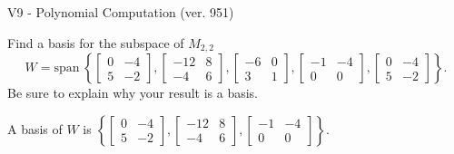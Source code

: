 \begin{exercise}
  \begin{exerciseTitle}V9 - Polynomial Computation (ver. 951)\end{exerciseTitle}
  \begin{exerciseStatement}
    Find a basis for the subspace of \(M_{2,2}\) 
\[W=\mathrm{span}\ \left\{\left[\begin{array}{cc}
0 & -4 \\
5 & -2
\end{array}\right] , \left[\begin{array}{cc}
-12 & 8 \\
-4 & 6
\end{array}\right] , \left[\begin{array}{cc}
-6 & 0 \\
3 & 1
\end{array}\right] , \left[\begin{array}{cc}
-1 & -4 \\
0 & 0
\end{array}\right] , \left[\begin{array}{cc}
0 & -4 \\
5 & -2
\end{array}\right]\right\}.\]
 Be sure to explain why your result is a basis.


  \end{exerciseStatement}
  \begin{exerciseAnswer}
   A basis of \(W\) is  \(\left\{\left[\begin{array}{cc}
0 & -4 \\
5 & -2
\end{array}\right] , \left[\begin{array}{cc}
-12 & 8 \\
-4 & 6
\end{array}\right] , \left[\begin{array}{cc}
-1 & -4 \\
0 & 0
\end{array}\right]\right\}\).
  


  \end{exerciseAnswer}
\end{exercise}